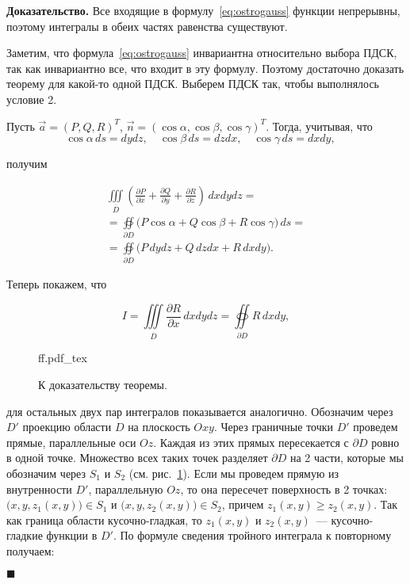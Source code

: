 \documentclass[12pt, a4paper]{article} %
\newcommand{\incfig}[1]{%
    \def\svgwidth{\columnwidth}
    {#1.pdf_tex}
}
\newcommand{\dd}[2]{\frac{\partial#1}{\partial#2}}
\renewcommand{\ge}{\geqslant}
\newenvironment{Proof}{\par\textbf{Доказательство. }}
	{\hfill$\blacksquare$\vspace{0.1cm}}
\begin{document}
\begin{Proof}
    Все входящие в формулу~\eqref{eq:ostrogauss} функции непрерывны,
    поэтому интегралы в обеих частях равенства существуют.

    Заметим, что формула~\eqref{eq:ostrogauss} инвариантна относительно
    выбора ПДСК, так как инвариантно все, что входит в эту формулу.
    Поэтому достаточно доказать теорему для какой-то одной ПДСК.
    Выберем ПДСК так, чтобы выполнялось условие 2.

    Пусть $\vec{a} = \left( P, Q, R \right)^T$, 
    $\vec{n} = (\cos \alpha, \cos \beta, \cos \gamma)^T$.
    Тогда, учитывая, что
    \begin{equation*}
        \cos \alpha\, ds = dydz, \quad
        \cos \beta\, ds = dzdx, \quad
        \cos \gamma\, ds = dxdy, \quad
    \end{equation*} 
    
    \noindent
    получим

    \begin{multline}\label{eq:ostrogauss1}\tag{1'}
        \iiint\limits_{\overline{D}} \left( 
            \dd Px + \dd Qy + \dd Rz
        \right)\, dxdydz = \\
        = \oiint\limits_{\partial D} \bigl( 
            P\cos\alpha + Q\cos\beta + R\cos\gamma
        \bigr)\, ds = \\
        = \oiint\limits_{\partial D} \bigl( 
            P\,dydz + Q\,dzdx + R\,dxdy
        \bigr)
    .\end{multline} 

    \noindent
    Теперь покажем, что

     \begin{equation*}
         I = \iiint\limits_{\overline{D}} \dd Rx \, dxdydz =
         \oiint\limits_{\partial D} R\,dxdy,
    \end{equation*} 

    \begin{figure}
        \centering
        \incfig{ff}
        \caption{К доказательству теоремы.}
        \label{fig:ff} %
    \end{figure} 

    \noindent
    для остальных двух пар интегралов показывается аналогично.
    Обозначим через $D'$ проекцию области  $D$ на плоскость  $Oxy$.
    Через граничные точки  $D'$ проведем прямые, параллельные оси  $Oz$.
    Каждая из этих прямых пересекается с  $\partial D$ ровно в одной точке.
    Множество всех таких точек разделяет $\partial D$ на 2 части,
    которые мы обозначим через  $S_1$ и  $S_2$ (см. рис.~\ref{fig:ff}).
    Если мы проведем прямую из внутренности $D'$, параллельную  $Oz$, 
    то она пересечет поверхность в 2 точках:  $\bigl( x, y, z_1(x, y) \bigr) \in S_1$ и $\bigl( x, y, z_2(x, y) \bigr) \in S_2$,
    причем $z_1(x, y) \ge z_2(x, y)$.
    Так как граница области кусочно-гладкая, то $z_1(x, y)$ и $z_2(x, y)$~---
    кусочно-гладкие функции в $D'$.
    По формуле сведения тройного интеграла к повторному получаем:


\end{Proof}
\end{document}

